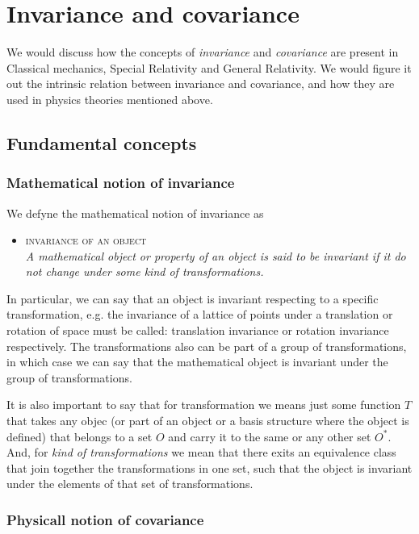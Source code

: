 \documentclass[10pt, letterpaper, oneside]{book}
\theoremstyle{theorem} %
\theoremstyle{theorem} %
\theoremstyle{definition}
\theoremstyle{remark}
\theoremstyle{definition}
\theoremstyle{definition}
\theoremstyle{theorem}
\begin{document}
\chapter{Invariance and covariance}
We would discuss how the concepts of \textit{invariance} and \textit{covariance} are present in Classical mechanics, Special Relativity and General Relativity. We would figure it out the intrinsic relation between invariance and covariance, and how they are used in physics theories mentioned above.

\section{Fundamental concepts}
\subsection{Mathematical notion of invariance}
We defyne the mathematical notion of invariance as
\begin{itemize}
	\item[] \textsc{invariance of an object}\\
	\textit{A mathematical object or property of an object is said to be invariant if it do not change under some kind of transformations.}
	
\end{itemize}

In particular, we can say that an object is invariant respecting to a specific transformation, e.g. the invariance of a lattice of points under a translation or rotation of space must be called: translation invariance or rotation invariance respectively. The transformations also can be part of a group of transformations, in which case we can say that the mathematical object is invariant under the group of transformations.

It is also important to say that for transformation we means just some function $T$ that takes any objec (or part of an object or a basis structure where the object is defined) that belongs to a set $O$ and carry it to the same or any other set $O^*$. And, for \textit{kind of transformations} we mean that there exits an equivalence class that join together the transformations in one set, such that the object is invariant under the elements of that set of transformations.

\subsection{Physicall notion of covariance}
\end{document}
